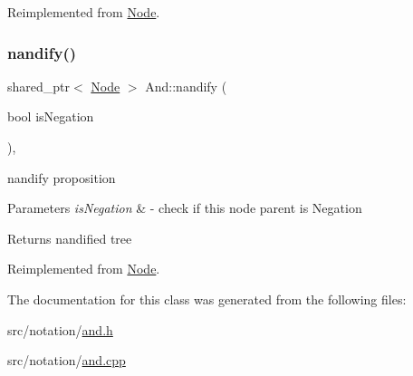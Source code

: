 Reimplemented from \hyperlink{class_node_afd0c2045f3955e02e3aa1e2e987f10b2}{Node}.

\mbox{\label{class_and_a790a8f5b095f664f0a879d2bf96c972d}} 
\subsubsection{\texorpdfstring{nandify()}{nandify()}}
{\footnotesize\ttfamily shared\+\_\+ptr$<$ \hyperlink{class_node}{Node} $>$ And\+::nandify (\begin{DoxyParamCaption}\item[{bool}]{is\+Negation }\end{DoxyParamCaption})\hspace{0.3cm}{\ttfamily [override]}, {\ttfamily [virtual]}}



nandify proposition 


\begin{DoxyParams}{Parameters}
{\em is\+Negation} & -\/ check if this node parent is Negation \\
\hline
\end{DoxyParams}
\begin{DoxyReturn}{Returns}
nandified tree 
\end{DoxyReturn}


Reimplemented from \hyperlink{class_node_a3b2e192b59b7e72908af7903c5a4e5c1}{Node}.



The documentation for this class was generated from the following files\+:\begin{DoxyCompactItemize}
\item 
src/notation/\hyperlink{and_8h}{and.\+h}\item 
src/notation/\hyperlink{and_8cpp}{and.\+cpp}\end{DoxyCompactItemize}
